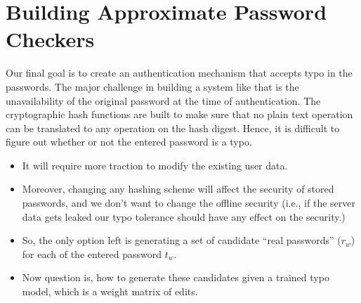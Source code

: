 \section{Building Approximate Password Checkers}
\label{sec:constructions}

Our final goal is to create an authentication mechanism that accepts typo in the
passwords. The major challenge in building a system like that is the
unavailability of the original password at the time of authentication.  The
cryptographic hash functions are built to make sure that no plain text operation
can be translated to any operation on the hash digest. Hence, it is difficult to
figure out whether or not the entered password is a typo.   

\begin{itemize}
\item It will require more traction to modify the existing user data.
\item Moreover, changing any hashing scheme will affect the security of stored
  passwords, and we don't want to change the offline security (i.e., if the
  server data gets leaked our typo tolerance should have any effect on the security.)
\item So, the only option left is generating a set of candidate ``real
  passwords'' ($r_w$) for each of the entered password $t_w$.
\item Now question is, how to generate these candidates given a trained typo
  model, which is a weight matrix of edits.
\end{itemize}





